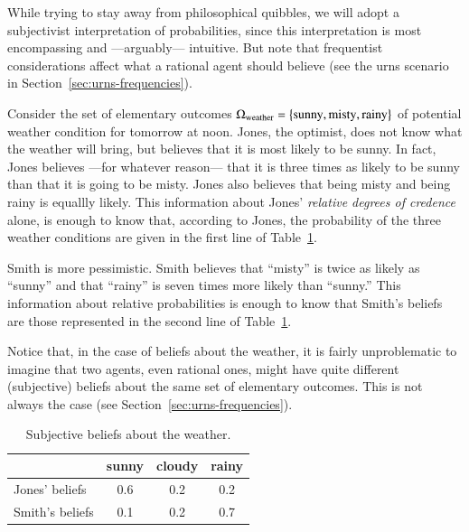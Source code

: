 \documentclass[nobib,nofonts]{tufte-handout}
\begin{document}
While trying to stay away from philosophical quibbles, we will adopt a subjectivist interpretation of probabilities, since this interpretation is most encompassing and ---arguably--- intuitive.
But note that frequentist considerations affect what a rational agent should believe (see the urns scenario in Section~\ref{sec:urns-frequencies}).

\begin{example}
  Consider the set of elementary outcomes $\Omega_{\text{weather}} = \left\{\text{sunny}, \text{misty}, \text{rainy}\right\}$ of potential weather condition for tomorrow at noon.
Jones, the optimist, does not know what the weather will bring, but believes that it is most likely to be sunny.
In fact, Jones believes ---for whatever reason--- that it is three times as likely to be sunny than that it is going to be misty.
Jones also believes that being misty and being rainy is equallly likely.
This information about Jones' \emph{relative degrees of credence} alone, is enough to know that, according to Jones, the probability of the three weather conditions are given in the first line of Table~\ref{tab:beliefs-weather}.

Smith is more pessimistic.
Smith believes that ``misty'' is twice as likely as ``sunny'' and that ``rainy'' is seven times more likely than ``sunny.''
This information about relative probabilities is enough to know that Smith's beliefs are those represented in the second line of Table~\ref{tab:beliefs-weather}.

Notice that, in the case of beliefs about the weather, it is fairly unproblematic to imagine that two agents, even rational ones, might have quite different (subjective) beliefs about the same set of elementary outcomes.
This is not always the case (see Section~\ref{sec:urns-frequencies}).

\begin{table}
  \centering
  \begin{tabular}{lccc}
    & sunny & cloudy & rainy \\ \midrule
    Jones' beliefs  & 0.6   & 0.2    & 0.2   \\
    Smith's beliefs & 0.1   & 0.2    & 0.7   \\
  \end{tabular}

  \caption{Subjective beliefs about the weather.}
  \label{tab:beliefs-weather}
\end{table}
\end{example}
\end{document}
